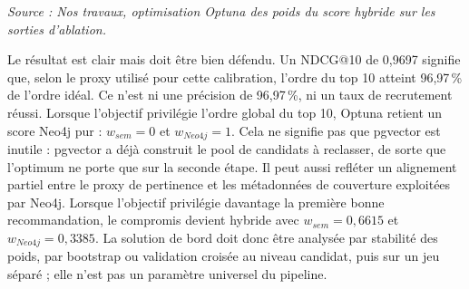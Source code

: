 \documentclass[12pt,twoside]{report}
\newcommand{\source}[1]{%
  \par\vspace{0.2\baselineskip}
  {\centering\footnotesize\itshape Source : #1\par}
}
\begin{document}
\begin{table}[H]
\centering
\caption{Pondérations retenues selon la fonction objectif du score hybride}
\label{tab:eval_optimisation_poids_hybrides}
\normalsize
{}
\source{Nos travaux, optimisation Optuna des poids du score hybride sur les sorties d'ablation.}
\end{table}

Le résultat est clair mais doit être bien défendu. Un NDCG@10 de 0,9697 signifie que, selon le proxy utilisé pour cette calibration, l'ordre du top 10 atteint 96,97\,\% de l'ordre idéal. Ce n'est ni une précision de 96,97\,\%, ni un taux de recrutement réussi. Lorsque l'objectif privilégie l'ordre global du top 10, Optuna retient un score Neo4j pur : $w_{sem}=0$ et $w_{Neo4j}=1$. Cela ne signifie pas que pgvector est inutile : pgvector a déjà construit le pool de candidats à reclasser, de sorte que l'optimum ne porte que sur la seconde étape. Il peut aussi refléter un alignement partiel entre le proxy de pertinence et les métadonnées de couverture exploitées par Neo4j. Lorsque l'objectif privilégie davantage la première bonne recommandation, le compromis devient hybride avec $w_{sem}=0{,}6615$ et $w_{Neo4j}=0{,}3385$. La solution de bord doit donc être analysée par stabilité des poids, par bootstrap ou validation croisée au niveau candidat, puis sur un jeu séparé ; elle n'est pas un paramètre universel du pipeline.
\end{document}
